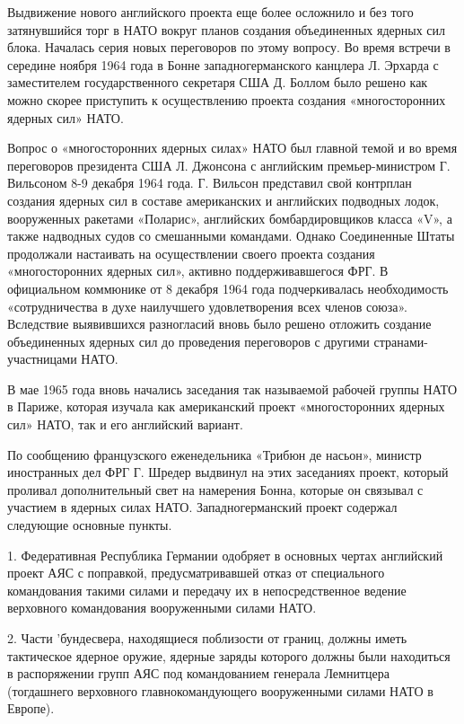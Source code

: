 \documentclass[12pt, a4paper, openany]{book}
\begin{document}
		Выдвижение нового английского проекта еще более осложнило и без того затянувшийся торг в НАТО вокруг планов создания объединенных ядерных сил блока. Началась серия новых переговоров по этому вопросу. Во время встречи в середине ноября 1964 года в Бонне западногерманского канцлера Л. Эрхарда с заместителем государственного секретаря США Д. Боллом было решено как можно скорее приступить к осуществлению проекта создания «многосторонних ядерных сил» НАТО.
		
		Вопрос о «многосторонних ядерных силах» НАТО был главной темой и во время переговоров президента США Л. Джонсона с английским премьер-министром Г. Вильсоном 8-9 декабря 1964 года. Г. Вильсон представил свой контрплан создания ядерных сил в составе американских и английских подводных лодок, вооруженных ракетами «Поларис», английских бомбардировщиков класса «V», а также надводных судов со смешанными командами. Однако Соединенные Штаты продолжали настаивать на осуществлении своего проекта создания «многосторонних ядерных сил», активно поддерживавшегося ФРГ. В официальном коммюнике от 8 декабря 1964 года подчеркивалась необходимость «сотрудничества в духе наилучшего удовлетворения всех членов союза». Вследствие выявившихся разногласий вновь было решено отложить создание объединенных ядерных сил до проведения переговоров с другими странами-участницами НАТО.
		
		В мае 1965 года вновь начались заседания так называемой рабочей группы НАТО в Париже, которая изучала как американский проект «многосторонних ядерных сил» НАТО, так и его английский вариант.
		
		По сообщению французского еженедельника «Трибюн де насьон», министр иностранных дел ФРГ Г. Шредер выдвинул на этих заседаниях проект, который проливал дополнительный свет на намерения Бонна, которые он связывал с участием в ядерных силах НАТО. Западногерманский проект содержал следующие основные пункты.
		
		1. Федеративная Республика Германии одобряет в основных чертах английский проект АЯС с поправкой, предусматривавшей отказ от специального командования такими силами и передачу их в непосредственное ведение верховного командования вооруженными силами НАТО.
		
		2. Части 'бундесвера, находящиеся поблизости от границ, должны иметь тактическое ядерное оружие, ядерные заряды которого должны были находиться в распоряжении групп АЯС под командованием генерала Лемнитцера (тогдашнего верховного главнокомандующего вооруженными силами НАТО в Европе).
		
\end{document}
